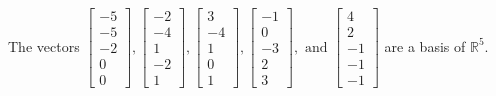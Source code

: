 \begin{exercise}
\begin{exerciseStatement}
  \end{exerciseStatement}
  \begin{exerciseAnswer}
   The vectors \(\left[\begin{array}{r}
-5 \\
-5 \\
-2 \\
0 \\
0
\end{array}\right] , \left[\begin{array}{r}
-2 \\
-4 \\
1 \\
-2 \\
1
\end{array}\right] , \left[\begin{array}{r}
3 \\
-4 \\
1 \\
0 \\
1
\end{array}\right] , \left[\begin{array}{r}
-1 \\
0 \\
-3 \\
2 \\
3
\end{array}\right] , \text{ and } \left[\begin{array}{r}
4 \\
2 \\
-1 \\
-1 \\
-1
\end{array}\right]\) 
  	 are  a basis of \(\mathbb{R}^5\).
  


  \end{exerciseAnswer}
\end{exercise}